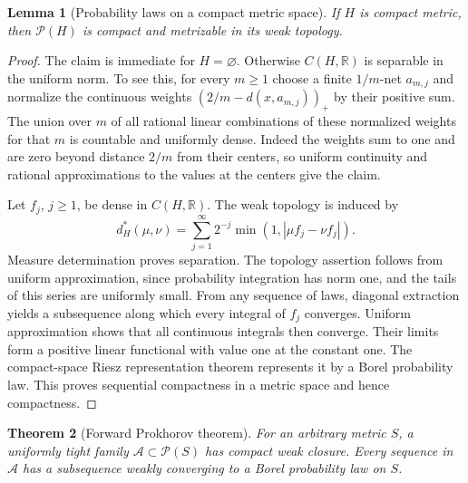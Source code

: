 \documentclass[11pt,oneside,openany]{book}
\newcommand{\R}{\mathbb{R}}
\theoremstyle{plain}
\newtheorem{theorem}{Theorem}[chapter]
\newtheorem{lemma}[theorem]{Lemma}
\theoremstyle{definition}
\theoremstyle{remark}
\begin{document}
\begin{lemma}[Probability laws on a compact metric space]
\label{lem:p06-compact-base}
If \(H\) is compact metric, then \(\mathcal P(H)\) is compact and
metrizable in its weak topology.
\end{lemma}

\begin{proof}
The claim is immediate for \(H=\varnothing\). Otherwise
\(C(H,\R)\) is separable in the uniform norm. To see this, for every
\(m\geq1\) choose a finite \(1/m\)-net \(a_{m,j}\) and normalize the
continuous weights \((2/m-d(x,a_{m,j}))_+\) by their positive sum.
The union over \(m\) of all rational linear combinations of these
normalized weights for that \(m\) is countable and uniformly dense.
Indeed the weights sum to one and are zero beyond distance \(2/m\)
from their centers, so uniform continuity and rational
approximations to the values at the centers give the claim.

Let \(f_j\), \(j\geq1\), be dense in \(C(H,\R)\). The weak topology
is induced by
\[
 d_H^*(\mu,\nu)
  =\sum_{j=1}^\infty 2^{-j}
       \min(1,|\mu f_j-\nu f_j|).
\]
Measure determination proves separation. The topology assertion
follows from uniform approximation, since probability integration
has norm one, and the tails of this series are uniformly small.
From any sequence of laws, diagonal extraction yields a subsequence
along which every integral of \(f_j\) converges. Uniform
approximation shows that all continuous integrals then converge.
Their limits form a positive linear functional with value one at
the constant one. The compact-space Riesz representation theorem
represents it by a Borel probability law. This proves sequential
compactness in a metric space and hence compactness.
\end{proof}

\begin{theorem}[Forward Prokhorov theorem]
\label{thm:p06-prokhorov-forward}
For an arbitrary metric \(S\), a uniformly tight family
\(\mathcal A\subset\mathcal P(S)\) has compact weak closure. Every
sequence in \(\mathcal A\) has a subsequence weakly converging to a
Borel probability law on \(S\).
\end{theorem}
\end{document}
